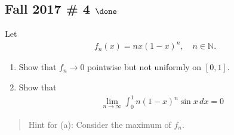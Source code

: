 \hypertarget{fall-2017-4-done}{%
\subsection{\texorpdfstring{Fall 2017 \# 4
\(\done\)}{Fall 2017 \# 4 \textbackslash done}}\label{fall-2017-4-done}}

Let
\begin{align*}
f_{n}(x) = n x(1-x)^{n}, \quad n \in {\mathbb{N}}.
\end{align*}

\begin{enumerate}
\def\labelenumi{\alph{enumi}.}
\item
  Show that \(f_n \to 0\) pointwise but not uniformly on \([0, 1]\).
\item
  Show that
  \begin{align*}
  \lim _{n \to \infty} \int _{0}^{1} n(1-x)^{n} \sin x \, dx = 0
  \end{align*}
\end{enumerate}

\begin{quote}
Hint for (a): Consider the maximum of \(f_n\).
\end{quote}

